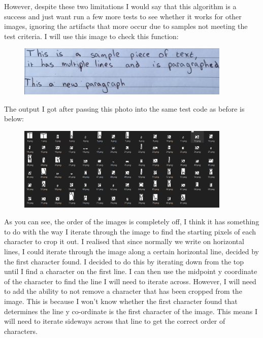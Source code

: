 \documentclass{report}
\begin{document}
\newline
However, despite these two limitations I would say that this algorithm is a success and just want run a few more tests to see whether it works for other images, ignoring the artifacts that more occur due to samples not meeting the test criteria.
\newline
I will use this image to check this function:
\begin{figure}[H]
    \centering
    \includegraphics[width = 4in]{Images/Development and Testing/Stage 6/Test Images/testImage2.jpg}
    \label{fig:test Image 2}
\end{figure}
\noindent The output I got after passing this photo into the same test code as before is below:
\begin{figure}[H]
    \centering
    \includegraphics[width = 4in]{Images/Development and Testing/Stage 6/Tests/Test 2 Output.png}
    \label{fig:Test 2 Output}
\end{figure}
\noindent As you can see, the order of the images is completely off, I think it has something to do with the way I iterate through the image to find the starting pixels of each character to crop it out. I realised that since normally we write on horizontal lines, I could iterate through the image along a certain horizontal line, decided by the first character found. I decided to do this by iterating down from the top until I find a character on the first line. I can then use the midpoint y coordinate of the character to find the line I will need to iterate across. However, I will need to add the ability to not remove a character that has been cropped from the image. This is because I won't know whether the first character found that determines the line y co-ordinate is the first character of the image. This means I will need to iterate sideways across that line to get the correct order of characters.
\end{document}
